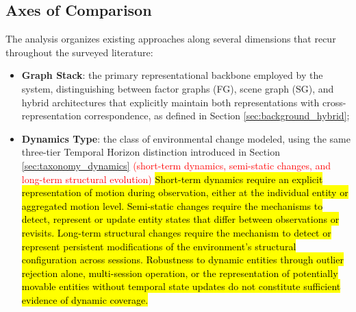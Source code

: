 \subsection{Axes of Comparison}\label{sec:taxonomy_axes}
The analysis organizes existing approaches along several dimensions that recur throughout the surveyed literature:
\begin{itemize}
    \item \textbf{Graph Stack}: the primary representational backbone employed by the system, distinguishing between factor graphs (FG), scene graph (SG), and hybrid architectures that explicitly maintain both representations with cross-representation correspondence, as defined in Section \ref{sec:background_hybrid};
    \item \textbf{Dynamics Type}: the class of environmental change modeled, using the same three-tier Temporal Horizon distinction introduced in Section \ref{sec:taxonomy_dynamics} \textcolor{red}{(short-term dynamics, semi-static changes, and long-term structural evolution)} \hl{Short-term dynamics require an explicit representation of motion during observation, either at the individual entity or aggregated motion level. Semi-static changes require the mechanisms to detect, represent or update entity states that differ between observations or revisits. Long-term structural changes require the mechanism to detect or represent persistent modifications of the environment's structural configuration across sessions. Robustness to dynamic entities through outlier rejection alone, multi-session operation, or the representation of potentially movable entities without temporal state updates do not constitute sufficient evidence of dynamic coverage.}
    

\end{itemize}
